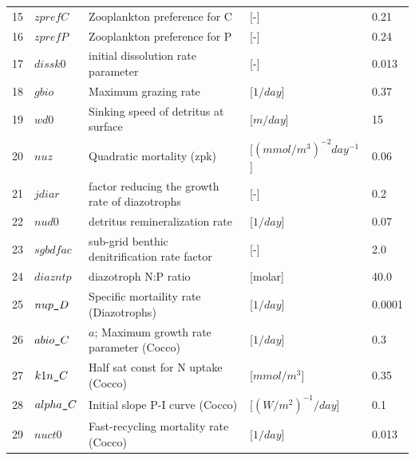 \documentclass[a4paper]{article}
\begin{document}
\begin{itemize}
{\begin{longtable}{lllll}
   15  & $zprefC$           & Zooplankton preference for C                                & [-]                           & 0.21       \\
   16  & $zprefP$           & Zooplankton preference for P                                & [-]                           & 0.24       \\ 
   17  & $dissk0$           & initial dissolution rate parameter                          & [-]                           & 0.013      \\
   18  & $gbio$             &  Maximum grazing rate                                        & [$1/day$]                     & 0.37       \\
   19  & $wd0$              &  Sinking speed of detritus at surface                        & [$m/day$]                     & 15         \\
   20  & $nuz$              & Quadratic mortality (zpk)                                   & [$(mmol/m^3)^{-2}day^{-1}$]   & 0.06       \\
   21  & $jdiar$            & factor reducing the growth rate of diazotrophs              & [-]                           & 0.2        \\
   22  & $nud0$             & detritus remineralization rate                              & [$1/day$]                     & 0.07       \\
   23  & $sgbdfac$          & sub-grid benthic denitrification rate factor                & [-]                           & 2.0        \\
   24  & $diazntp$          & diazotroph N:P ratio                                        & [molar]                       & 40.0       \\
   25  & $nup\verb|_|D$     & Specific mortaility rate (Diazotrophs)                      & [$1/day$]                     & 0.0001     \\
   26  & $abio\verb|_|C$    & $a$; Maximum growth rate parameter (Cocco)                  & [$1/day$]                     & 0.3        \\
   27  & $k1n\verb|_|C$     & Half sat const for N uptake (Cocco)                         & [$mmol/m^3$]                  & 0.35       \\
   28  & $alpha\verb|_|C$   & Initial slope P-I curve (Cocco)                             & [$(W/m^2)^{-1}/day$]          & 0.1        \\
   29  & $nuct0$            & Fast-recycling mortality rate (Cocco)                       & [$1/day$]                     & 0.013      \\

\end{longtable}}
\end{itemize}
\end{document}
